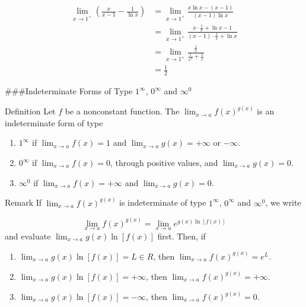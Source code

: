 \documentclass[
  letterpaper,
  DIV=11,
  numbers=noendperiod]{scrartcl}
\begin{document}
\[
\begin{aligned}
\displaystyle\lim_{x\to 1^+}{\left(\frac{x}{x-1}-\frac{1}{\ln x}\right)}&=\displaystyle\lim_{x\to 1^+}{\frac{x\ln x -(x-1)}{(x-1)\ln x}}\\&=\displaystyle\lim_{x\to 1^+}{\frac{x\cdot \frac{1}{x}+\ln x-1}{(x-1)\cdot \frac{1}{x}+\ln x}}\\&=\displaystyle\lim_{x\to 1^+}{\frac{\frac{1}{x}}{\frac{1}{x^2}+\frac{1}{x}}}\\&=\frac{1}{2}
\end{aligned}
\]

\#\#\#Indeterminate Forms of Type \(1^\infty\), \(0^\infty\) and
\(\infty ^0\)

Definition Let \(f\) be a nonconstant function. The
\(\displaystyle\lim_{x\to a}{f(x)^{g(x)}}\) is an indeterminate form of
type

\begin{enumerate}
\def\labelenumi{\arabic{enumi}.}
\item
  \(1^\infty\) if \(\displaystyle\lim_{x\to a}{f(x)=1}\) and
  \(\displaystyle\lim_{x\to a}{g(x)=+\infty}\) or \(-\infty\).
\item
  \(0^\infty\) if \(\displaystyle\lim_{x\to a}{f(x)=0}\), through
  positive values, and \(\displaystyle\lim_{x\to a}{g(x)=0}\).
\item
  \(\infty ^0\) if \(\displaystyle\lim_{x\to a}{f(x)=+\infty}\) and
  \(\displaystyle\lim_{x\to a}{g(x)=0}\).
\end{enumerate}

Remark If \(\displaystyle\lim_{x\to a}{f(x)^{g(x)}}\) is indeterminate
of type \(1^\infty\), \(0^\infty\) and \(\infty ^0\), we write

\[
\displaystyle\lim_{x\to a}{f(x)^{g(x)}}=\displaystyle\lim_{x\to a}{e^{g(x) \ln [f(x)]}}
\] and evaluate \(\displaystyle\lim_{x\to a}{g(x) \ln [f(x)]}\) first.
Then, if

\begin{enumerate}
\def\labelenumi{\arabic{enumi}.}
\item
  \(\displaystyle\lim_{x\to a}{g(x) \ln [f(x)]}=L \in R\), then
  \(\displaystyle\lim_{x\to a}{f(x)^{g(x)}}=e^L\).
\item
  \(\displaystyle\lim_{x\to a}{g(x) \ln [f(x)]}=+\infty\), then
  \(\displaystyle\lim_{x\to a}{f(x)^{g(x)}}=+\infty\).
\item
  \(\displaystyle\lim_{x\to a}{g(x) \ln [f(x)]}=-\infty\), then
  \(\displaystyle\lim_{x\to a}{f(x)^{g(x)}}=0\).
\end{enumerate}
\end{document}
